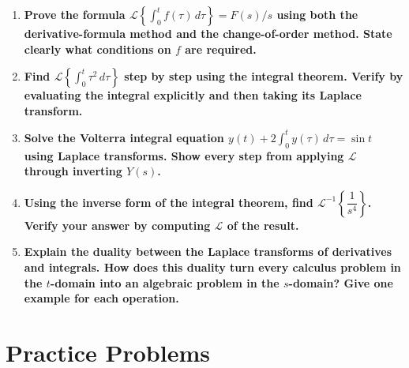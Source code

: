 \documentclass[12pt,a4paper]{article}
\begin{document}
\begin{enumerate}[label=\textbf{\arabic*.}, leftmargin=*, itemsep=10pt]

\item \textbf{Prove the formula $\mathcal{L}\!\left\{\int_0^t f(\tau)\,d\tau\right\} = F(s)/s$
using both the derivative-formula method and the change-of-order method. State clearly
what conditions on $f$ are required.}

\item \textbf{Find $\mathcal{L}\!\left\{\int_0^t \tau^2\,d\tau\right\}$ step by step
using the integral theorem. Verify by evaluating the integral explicitly and then taking
its Laplace transform.}

\item \textbf{Solve the Volterra integral equation
$y(t) + 2\int_0^t y(\tau)\,d\tau = \sin t$ using Laplace transforms. Show every step
from applying $\mathcal{L}$ through inverting $Y(s)$.}

\item \textbf{Using the inverse form of the integral theorem, find
$\mathcal{L}^{-1}\!\left\{\dfrac{1}{s^4}\right\}$. Verify your answer by computing
$\mathcal{L}$ of the result.}

\item \textbf{Explain the duality between the Laplace transforms of derivatives and
integrals. How does this duality turn every calculus problem in the $t$-domain into an
algebraic problem in the $s$-domain? Give one example for each operation.}

\end{enumerate}

\section{Practice Problems}
\end{document}
